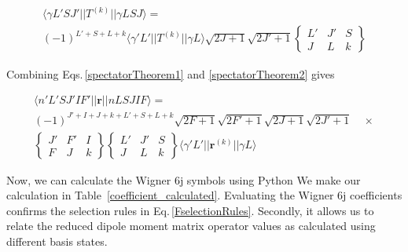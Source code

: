 \begin{multline}\label{spectatorTheorem2}
\langle\gamma L'SJ'||T^{(k)}||\gamma L S J\rangle=
\\(-1)^{L'+S+L+k}\langle\gamma'L'||T^{(k)}||\gamma L\rangle
\sqrt{2J+1}\sqrt{2J'+1}
\begin{Bmatrix}
L' & J' & S \\
J & L & k
\end{Bmatrix}
\end{multline}

Combining Eqs.\,\ref{spectatorTheorem1} and \ref{spectatorTheorem2} gives 

\begin{multline} \label{afterSpectators}
\langle n' L' S J' I F' ||\mathbf{r}||n L S J I F\rangle = \\
(-1)^{J'+I+J+k+L'+S+L+k}
\sqrt{2F+1}\sqrt{2F'+1}\sqrt{2J+1}\sqrt{2J'+1} \quad \times \\
\begin{Bmatrix}
J' & F' & I\\
F & J & k
\end{Bmatrix}
\begin{Bmatrix}
L' & J' & S\\
J & L & k
\end{Bmatrix}
\langle \gamma' L' ||\mathbf{r}^{(k)}|| \gamma L\rangle 
\end{multline}

Now, we can calculate the Wigner 6j symbols using Python %
We make our calculation in Table\, \ref{coefficient_calculated}. Evaluating the Wigner 6j coefficients confirms the selection rules in Eq.\,\ref{FselectionRules}. Secondly, it allows us to relate the reduced dipole moment matrix operator values as calculated using different basis states.

